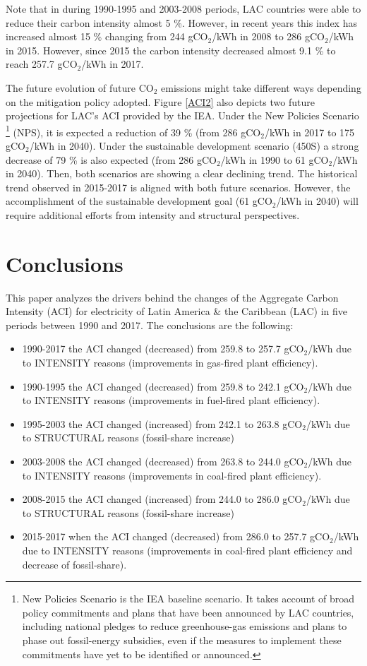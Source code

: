 \documentclass[energies,article,accept,moreauthors,12pt,a4paper]{mdpi} %
\begin{document}
Note that in during 1990-1995 and 2003-2008 periods, LAC countries were able to reduce their carbon intensity almost 5 \%. However, in recent years this index has increased almost 15 \% changing from 244 gCO$_2$/kWh in 2008 to 286 gCO$_2$/kWh in 2015. However, since 2015 the carbon intensity decreased almost 9.1 \% to reach 257.7 gCO$_2$/kWh in 2017.

The future evolution of future CO$_2$ emissions might take different ways depending on the mitigation policy adopted. Figure \ref{ACI2} also depicts two future projections for LAC's ACI provided by the IEA. Under the New Policies Scenario \footnote{New Policies Scenario is the IEA baseline scenario. It takes account of broad policy commitments and plans that have been announced by LAC countries, including national pledges to reduce greenhouse-gas emissions and plans to phase out fossil-energy subsidies, even if the measures to implement these commitments have yet to be identified or announced.} (NPS), it is expected a reduction of 39 \% (from 286 gCO$_2$/kWh in 2017 to 175 gCO$_2$/kWh in 2040). Under the sustainable development scenario (450S) a strong decrease of 79 \% is also expected (from 286 gCO$_2$/kWh  in 1990 to 61 gCO$_2$/kWh in 2040). Then, both scenarios are showing a clear declining trend. The historical trend observed in 2015-2017 is aligned with both future scenarios. However, the accomplishment of the sustainable development goal (61 gCO$_2$/kWh in 2040) will require additional efforts from intensity and structural perspectives.


\section{Conclusions} \label{sec7}
 
 This paper analyzes the drivers behind the changes of the Aggregate Carbon Intensity (ACI) for electricity of Latin America \& the Caribbean (LAC) in five periods between 1990 and 2017. The conclusions are the following:
 \begin{itemize}
  \item 1990-2017 the ACI changed (decreased) from 259.8 to 257.7 gCO$_2$/kWh due to INTENSITY reasons (improvements in  gas-fired plant efficiency).
  \item 1990-1995 the ACI changed (decreased) from 259.8 to 242.1 gCO$_2$/kWh due to INTENSITY reasons (improvements in  fuel-fired plant efficiency).
  \item 1995-2003 the ACI changed (increased) from 242.1 to 263.8 gCO$_2$/kWh due to STRUCTURAL reasons (fossil-share increase)
  \item 2003-2008 the ACI changed (decreased) from 263.8 to 244.0 gCO$_2$/kWh due to INTENSITY reasons (improvements in  coal-fired plant efficiency).
  \item 2008-2015   the ACI changed (increased) from 244.0 to 286.0 gCO$_2$/kWh due to STRUCTURAL reasons (fossil-share increase)
  \item 2015-2017 when the ACI changed (decreased) from 286.0 to 257.7 gCO$_2$/kWh  due to INTENSITY reasons (improvements in  coal-fired plant efficiency and decrease of fossil-share).
\end{itemize}
 
\end{document}
